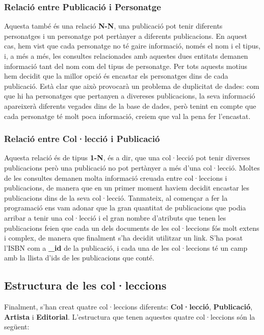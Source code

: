 \documentclass{article}
\begin{document}
\subsubsection*{Relaci\'o entre \textbf{Publicaci\'o} i \textbf{Personatge}}
Aquesta tamb\'e \'es una relaci\'o \textbf{N-N}, una publicaci\'o pot tenir diferents personatges i un personatge pot pert\`anyer a diferents publicacions. En aquest cas, hem vist que cada personatge no t\'e gaire informaci\'o, nom\'es el nom i el tipus, i, a m\'es a m\'es, les consultes relacionades amb aquestes dues entitats demanen informaci\'o tant del nom com del tipus de personatge. Per tots aquests motius hem decidit que la millor opci\'o \'es encastar els personatges dins de cada publicaci\'o. Est\`a clar que aix\`o provocar\`a un problema de duplicitat de dades: com que hi ha personatges que pertanyen a divereses publicacions, la seva informaci\'o apareixer\`a diferents vegades dins de la base de dades, per\`o tenint en compte que cada personatge t\'e molt poca informaci\'o, creiem que val la pena fer l'encastat.

\subsubsection*{Relaci\'o entre \textbf{Col·lecci\'o} i \textbf{Publicaci\'o}}
Aquesta relaci\'o \'es de tipus \textbf{1-N}, \'es a dir, que una col·lecci\'o pot tenir diverses publicacions per\`o una publicaci\'o no pot pert\`anyer a m\'es d'una col·lecci\'o. Moltes de les consultes demanen molta informaci\'o creuada entre col·leccions i publicacions, de manera que en un primer moment haviem decidit encastar les publicacions dins de la seva col·lecci\'o. Tanmateix, al començar a fer la programaci\'o ens vam adonar que la gran quantitat de publicacions que podia arribar a tenir una col·lecci\'o i el gran nombre d'atributs que tenen les publicacions feien que cada un dels documents de les col·leccions f\'os molt extens i complex, de manera que finalment s'ha decidit utilitzar un link. S'ha posat l'ISBN com a \textbf{\_id} de la publicaci\'o, i cada una de les col·leccions t\'e un camp amb la llista d'ids de les publicacions que cont\'e.

\subsection{Estructura de les col·leccions}
Finalment, s'han creat quatre col·leccions diferents: \textbf{Col·lecci\'o}, \textbf{Publicaci\'o}, \textbf{Artista} i \textbf{Editorial}. L'estructura que tenen aquestes quatre col·leccions s\'on la seg\"uent:
\end{document}
